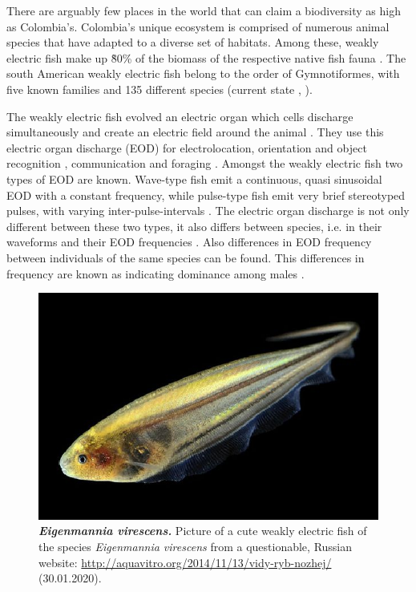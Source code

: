 There  are  arguably  few  places  in  the  world  that  can  claim  a biodiversity as high as Colombia’s. Colombia’s unique ecosystem is comprised of numerous animal species that have adapted to a diverse set of habitats. Among these, weakly electric fish make up \~80\%  of the biomass of the respective native fish fauna \citep{marrero1991notas}. The south American weakly electric fish belong to the order of Gymnotiformes, with five known families and 135 different species (current state \citeyear{albert2005diversity}, \citeauthor{albert2005diversity}).

The weakly electric fish evolved an electric organ which cells discharge simultaneously and create an electric field around the animal \citep{Zupanc_Bullock_2005}. They use this electric organ discharge (EOD) for electrolocation, orientation and object recognition \citep{Heiligenberg_73}, communication \citep{Hopkins_74} and foraging \citep{Nelson_MacIver_1999}. Amongst the weakly electric fish two types of EOD are known. Wave-type fish emit a continuous, quasi sinusoidal EOD with a constant frequency, while pulse-type fish emit very brief stereotyped pulses, with varying inter-pulse-intervals \citep{Zupanc_Bullock_2005}.
The electric organ discharge is 
not only different between these two types, it also differs between species, i.e. in their waveforms and their EOD frequencies \citep{Zupanc_Bullock_2005}.
Also differences in EOD frequency between individuals of the same species can be found. This differences in frequency are known as indicating dominance among males \citep{HAGEDORN1985}.\\

\begin{figure}
    \centering
    \includegraphics[width = \textwidth]{pictures/Eigenmannia_virescens.jpg}
    \caption{\textit{\textbf{Eigenmannia virescens.}} Picture of a cute weakly electric fish of the species \textit{Eigenmannia virescens} from a questionable, Russian website: \url{http://aquavitro.org/2014/11/13/vidy-ryb-nozhej/} (30.01.2020).}
    \label{fig:eigenmannia_cute}
\end{figure}


